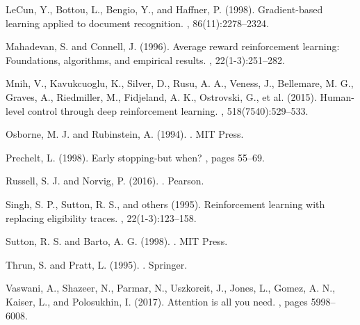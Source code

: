 \documentclass{article}
\begin{document}
\begin{thebibliography}{10}
LeCun, Y., Bottou, L., Bengio, Y., and Haffner, P. (1998).
\newblock Gradient-based learning applied to document recognition.
, 86(11):2278--2324.

Mahadevan, S. and Connell, J. (1996).
\newblock Average reward reinforcement learning: Foundations, algorithms, and empirical results.
, 22(1-3):251--282.

Mnih, V., Kavukcuoglu, K., Silver, D., Rusu, A. A., Veness, J., Bellemare, M. G., Graves, A., Riedmiller, M., Fidjeland, A. K., Ostrovski, G., et al. (2015).
\newblock Human-level control through deep reinforcement learning.
, 518(7540):529--533.

Osborne, M. J. and Rubinstein, A. (1994).
.
\newblock MIT Press.

Prechelt, L. (1998).
\newblock Early stopping-but when?
, pages 55--69.

Russell, S. J. and Norvig, P. (2016).
.
\newblock Pearson.

Singh, S. P., Sutton, R. S., and others (1995).
\newblock Reinforcement learning with replacing eligibility traces.
, 22(1-3):123--158.

Sutton, R. S. and Barto, A. G. (1998).
.
\newblock MIT Press.

Thrun, S. and Pratt, L. (1995).
.
\newblock Springer.

Vaswani, A., Shazeer, N., Parmar, N., Uszkoreit, J., Jones, L., Gomez, A. N., Kaiser, L., and Polosukhin, I. (2017).
\newblock Attention is all you need.
, pages 5998--6008.

\end{thebibliography}
\end{document}
